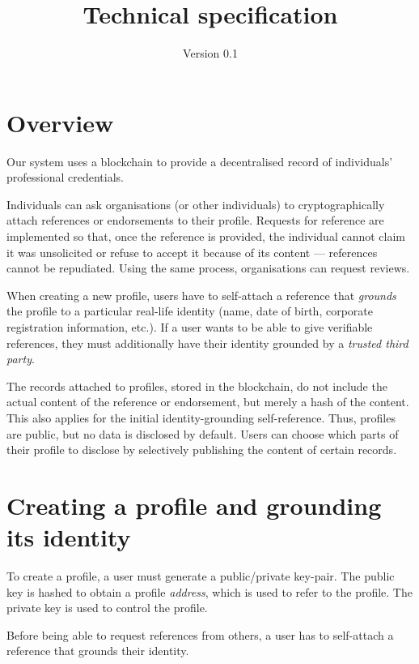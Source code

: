 \documentclass[a4paper, bibliography=totoc, titlepage=false]{scrartcl}
\title{Technical specification}
\subtitle{Version 0.1}
\date{}
\begin{document}
\maketitle

\section{Overview}

Our system uses a blockchain to provide a decentralised record of individuals' professional credentials.

Individuals can ask organisations (or other individuals) to cryptographically attach references or endorsements to their profile. Requests for reference are implemented so that, once the reference is provided, the individual cannot claim it was unsolicited or refuse to accept it because of its content --- references cannot be repudiated. Using the same process, organisations can request reviews.

When creating a new profile, users have to self-attach a reference that \emph{grounds} the profile to a particular real-life identity (name, date of birth, corporate registration information, etc.). If a user wants to be able to give verifiable references, they must additionally have their identity grounded by a \emph{trusted third party}.

The records attached to profiles, stored in the blockchain, do not include the actual content of the reference or endorsement,  but merely a hash of the content. This also applies for the initial identity-grounding self-reference. Thus, profiles are public, but no data is disclosed by default. Users can choose which parts of their profile to disclose by selectively publishing the content of certain records.


\section{Creating a profile and grounding its identity}

To create a profile, a user must generate a public/private key-pair. The public key is hashed to obtain a profile \emph{address}, which is used to refer to the profile. The private key is used to control the profile.

Before being able to request references from others, a user has to self-attach a reference that grounds their identity.
\end{document}

